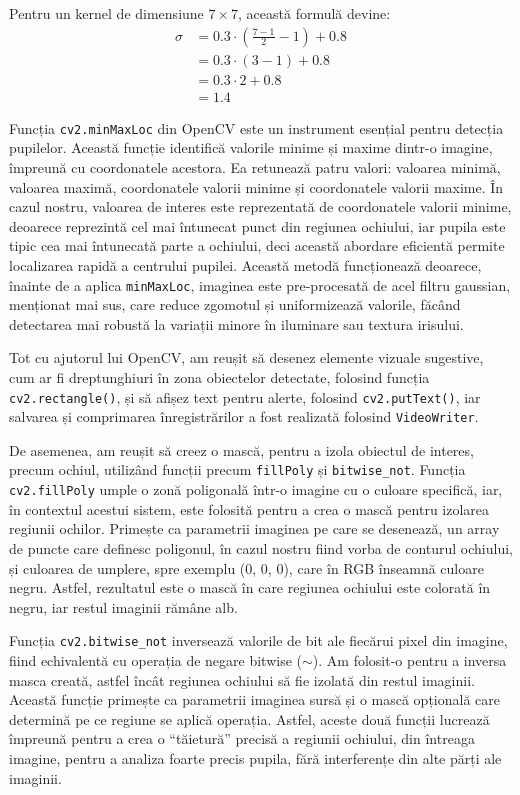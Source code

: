 \documentclass[12pt,a4paper]{article}
\begin{document}
Pentru un kernel de dimensiune \(7 \times 7\), această formulă devine:
\begin{align}
\sigma &= 0.3 \cdot \left( \frac{7 - 1}{2} - 1 \right) + 0.8 \nonumber \\
    &= 0.3 \cdot (3 - 1) + 0.8 \nonumber \\
    &= 0.3 \cdot 2 + 0.8 \nonumber \\
    &= 1.4
\end{align}

Funcția \texttt{cv2.minMaxLoc} din OpenCV este un instrument esențial pentru
detecția pupilelor. Această funcție identifică valorile minime și maxime
dintr-o imagine, împreună cu coordonatele acestora. Ea retunează patru
valori: valoarea minimă, valoarea maximă, coordonatele valorii minime și
coordonatele valorii maxime. În cazul nostru, valoarea de interes este
reprezentată de coordonatele valorii minime, deoarece reprezintă cel mai
întunecat punct din regiunea ochiului, iar pupila este tipic cea mai
întunecată parte a ochiului, deci această abordare eficientă permite
localizarea rapidă a centrului pupilei. Această metodă funcționează
deoarece, înainte de a aplica \texttt{minMaxLoc}, imaginea este pre-procesată de
acel filtru gaussian, menționat mai sus, care reduce zgomotul și
uniformizează valorile, făcând detectarea mai robustă la variații minore
în iluminare sau textura irisului.

Tot cu ajutorul lui OpenCV, am reușit să desenez elemente vizuale
sugestive, cum ar fi dreptunghiuri în zona obiectelor detectate,
folosind funcția \texttt{cv2.rectangle()}, și să afișez text pentru alerte,
folosind \texttt{cv2.putText()}, iar salvarea și comprimarea înregistrărilor a
fost realizată folosind \texttt{VideoWriter}.

De asemenea, am reușit să creez o mască, pentru a izola obiectul de
interes, precum ochiul, utilizând funcții precum \texttt{fillPoly} și
\texttt{bitwise\_not}. Funcția \texttt{cv2.fillPoly} umple o zonă poligonală într-o imagine
cu o culoare specifică, iar, în contextul acestui sistem, este folosită
pentru a crea o mască pentru izolarea regiunii ochilor. Primește ca
parametrii imaginea pe care se desenează, un array de puncte care
definesc poligonul, în cazul nostru fiind vorba de conturul ochiului, și
culoarea de umplere, spre exemplu (0, 0, 0), care în RGB înseamnă
culoare negru. Astfel, rezultatul este o mască în care regiunea ochiului
este colorată în negru, iar restul imaginii rămâne alb.

Funcția \texttt{cv2.bitwise\_not} inversează valorile de bit ale fiecărui pixel
din imagine, fiind echivalentă cu operația de negare bitwise ($\sim$). Am
folosit-o pentru a inversa masca creată, astfel încât regiunea ochiului
să fie izolată din restul imaginii. Această funcție primește ca
parametrii imaginea sursă și o mască opțională care determină pe ce
regiune se aplică operația. Astfel, aceste două funcții lucrează
împreună pentru a crea o ``tăietură'' precisă a regiunii ochiului, din
întreaga imagine, pentru a analiza foarte precis pupila, fără
interferențe din alte părți ale imaginii.
\end{document}
